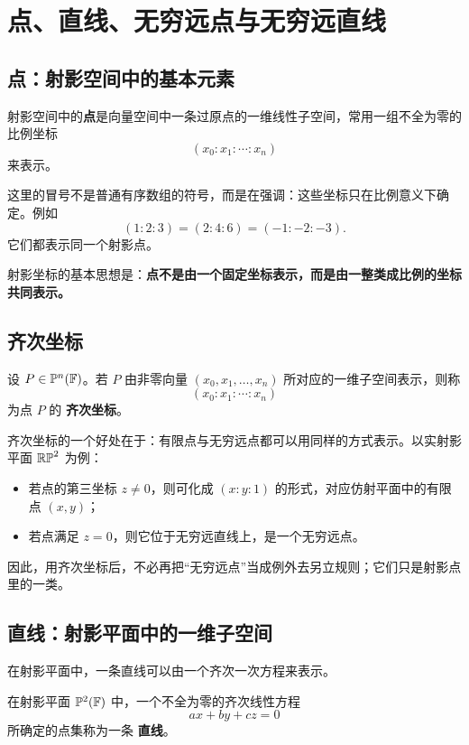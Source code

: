 \section{点、直线、无穷远点与无穷远直线}

\subsection{点：射影空间中的基本元素}
\begin{definition}
射影空间中的\textbf{点}是向量空间中一条过原点的一维线性子空间，常用一组不全为零的比例坐标
\[
(x_0:x_1:\cdots:x_n)
\]
来表示。
\end{definition}

这里的冒号不是普通有序数组的符号，而是在强调：这些坐标只在比例意义下确定。例如
\[
(1:2:3)=(2:4:6)=(-1:-2:-3).
\]
它们都表示同一个射影点。

射影坐标的基本思想是：\textbf{点不是由一个固定坐标表示，而是由一整类成比例的坐标共同表示。}

\subsection{齐次坐标}
\begin{definition}
设 $P\in \mathbb{P}^n(\mathbb{F})$。若 $P$ 由非零向量 $(x_0,x_1,\dots,x_n)$ 所对应的一维子空间表示，则称
\[
(x_0:x_1:\cdots:x_n)
\]
为点 $P$ 的 \textbf{齐次坐标}。
\end{definition}

齐次坐标的一个好处在于：有限点与无穷远点都可以用同样的方式表示。以实射影平面 $\mathbb{RP}^2$ 为例：

\begin{itemize}
    \item 若点的第三坐标 $z\neq 0$，则可化成 $(x:y:1)$ 的形式，对应仿射平面中的有限点 $(x,y)$；
    \item 若点满足 $z=0$，则它位于无穷远直线上，是一个无穷远点。
\end{itemize}

因此，用齐次坐标后，不必再把“无穷远点”当成例外去另立规则；它们只是射影点里的一类。

\subsection{直线：射影平面中的一维子空间}
在射影平面中，一条直线可以由一个齐次一次方程来表示。

\begin{definition}
在射影平面 $\mathbb{P}^2(\mathbb{F})$ 中，一个不全为零的齐次线性方程
\[
ax+by+cz=0
\]
所确定的点集称为一条 \textbf{直线}。
\end{definition}

